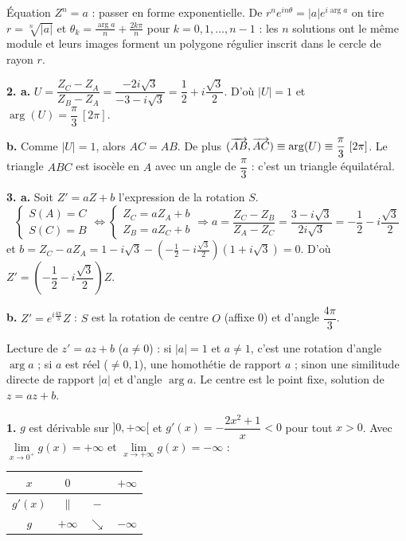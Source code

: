 \documentclass[11pt]{article}
\begin{document}
\begin{methode}
Équation $Z^n = a$ : passer en forme exponentielle. De
$r^n e^{in\theta} = |a|e^{i\arg a}$ on tire $r = \sqrt[n]{|a|}$ et
$\theta_k = \frac{\arg a}{n} + \frac{2k\pi}{n}$ pour
$k = 0, 1, \ldots, n-1$ : les $n$ solutions ont le même module et leurs
images forment un polygone régulier inscrit dans le cercle de rayon $r$.
\end{methode}

\textbf{2. a.} $U = \dfrac{Z_C - Z_A}{Z_B - Z_A} = \dfrac{-2i\sqrt{3}}{-3 - i\sqrt{3}} = \dfrac{1}{2} + i\dfrac{\sqrt{3}}{2}$. D'où $|U| = 1$ et $\arg(U) = \dfrac{\pi}{3}\ [2\pi]$.

\textbf{b.} Comme $|U| = 1$, alors $AC = AB$. De plus $(\overrightarrow{AB}, \overrightarrow{AC}) \equiv \arg(U) \equiv \dfrac{\pi}{3}\ [2\pi]$. Le triangle $ABC$ est isocèle en $A$ avec un angle de $\dfrac{\pi}{3}$ : c'est un triangle équilatéral.

\textbf{3. a.} Soit $Z' = aZ + b$ l'expression de la rotation $S$.
\[ \begin{cases} S(A) = C \\ S(C) = B \end{cases} \Longleftrightarrow \begin{cases} Z_C = aZ_A + b \\ Z_B = aZ_C + b \end{cases} \Rightarrow a = \frac{Z_C - Z_B}{Z_A - Z_C} = \frac{3 - i\sqrt{3}}{2i\sqrt{3}} = -\frac{1}{2} - i\frac{\sqrt{3}}{2} \]
et $b = Z_C - aZ_A = 1 - i\sqrt{3} - \left(-\tfrac{1}{2} - i\tfrac{\sqrt{3}}{2}\right)(1 + i\sqrt{3}) = 0$. D'où $Z' = \left(-\dfrac{1}{2} - i\dfrac{\sqrt{3}}{2}\right)Z$.

\textbf{b.} $Z' = e^{i\frac{4\pi}{3}}Z$ : $S$ est la rotation de centre $O$ (affixe 0) et d'angle $\dfrac{4\pi}{3}$.

\begin{rappel}
Lecture de $z' = az + b$ ($a \ne 0$) : si $|a| = 1$ et $a \ne 1$, c'est
une rotation d'angle $\arg a$ ; si $a$ est réel ($\ne 0, 1$), une
homothétie de rapport $a$ ; sinon une similitude directe de rapport
$|a|$ et d'angle $\arg a$. Le centre est le point fixe, solution de
$z = az + b$.
\end{rappel}

\prob{}
\textbf{1.} $g$ est dérivable sur $]0, +\infty[$ et $g'(x) = -\dfrac{2x^2 + 1}{x} < 0$ pour tout $x > 0$. Avec $\lim\limits_{x\to 0^+} g(x) = +\infty$ et $\lim\limits_{x\to+\infty} g(x) = -\infty$ :
\begin{center}\renewcommand{\arraystretch}{1.4}
\begin{tabular}{|c|ccc|}
\hline $x$ & $0$ & & $+\infty$ \\\hline $g'(x)$ & $\|$ & $-$ & \\\hline $g$ & $+\infty$ & $\searrow$ & $-\infty$ \\\hline
\end{tabular}
\end{center}
\end{document}

